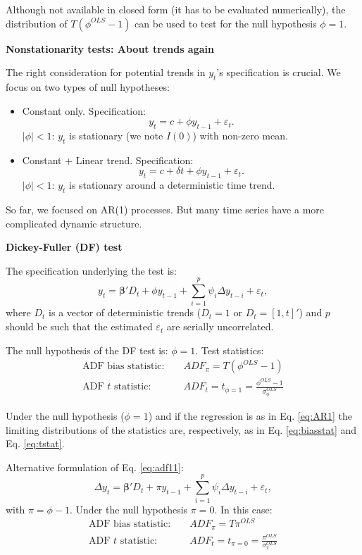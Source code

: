 \documentclass[
  11pt,
]{book}
\providecommand{\tightlist}{%
  \setlength{\itemsep}{0pt}\setlength{\parskip}{0pt}}
\theoremstyle{definition}
\theoremstyle{definition}
\theoremstyle{definition}
\theoremstyle{definition}
\theoremstyle{remark}
\begin{document}
Although not available in closed form (it has to be evaluated numerically), the distribution of \(T(\phi^{OLS}-1)\) can be used to test for the null hypothesis \(\phi=1\).

\textbf{Nonstationarity tests: About trends again}

The right consideration for potential trends in \(y_t\)'s specification is crucial. We focus on two types of null hypotheses:

\begin{itemize}
\tightlist
\item
  Constant only. Specification:
  \[
  y_t = c + \phi y_{t-1} + \varepsilon_t.
  \]
  \(|\phi|<1\): \(y_t\) is stationary (we note \(I(0)\)) with non-zero mean.
\item
  Constant + Linear trend. Specification:
  \[
  y_t = c + \delta t + \phi y_{t-1} + \varepsilon_t.
  \]
  \(|\phi|<1\): \(y_t\) is stationary around a deterministic time trend.
\end{itemize}

So far, we focused on AR(1) processes. But many time series have a more complicated dynamic structure.

\textbf{Dickey-Fuller (DF) test}

The specification underlying the \citet{DF1979} test is:
\begin{equation}
y_t = \boldsymbol\beta'D_t + \phi y_{t-1} + \sum_{i=1}^{p}\psi_i \Delta y_{t-i} + \varepsilon_t,\label{eq:adf11}
\end{equation}
where \(D_t\) is a vector of deterministic trends (\(D_t = 1\) or \(D_t = [1,t]'\)) and \(p\) should be such that the estimated \(\varepsilon_t\) are serially uncorrelated.

The null hypothesis of the DF test is: \(\phi=1\). Test statistics:
\begin{eqnarray*}
\mbox{ADF bias statistic: } && ADF_\pi =T(\phi^{OLS}-1)\\
\mbox{ADF $t$ statistic: } && ADF_t = t_{\phi=1} = \frac{\phi^{OLS}-1}{\sigma^{OLS}_{\phi}}
\end{eqnarray*}

Under the null hypothesis (\(\phi=1\)) and if the regression is as in Eq. \eqref{eq:AR1} the limiting distributions of the statistics are, respectively, as in Eq. \eqref{eq:biasstat} and Eq. \eqref{eq:tstat}.

Alternative formulation of Eq. \eqref{eq:adf11}:
\[
\Delta y_t = \boldsymbol\beta' D_t + \pi y_{t-1} + \sum_{i=1}^{p}\psi_i \Delta y_{t-i} + \varepsilon_t,
\]
with \(\pi = \phi - 1\). Under the null hypothesis \(\pi = 0\). In this case:
\begin{eqnarray*}
\mbox{ADF bias statistic: } && ADF_\pi = T\pi^{OLS}\\
\mbox{ADF $t$ statistic: } && ADF_t = t_{\pi=0} = \frac{\pi^{OLS}}{\sigma^{OLS}_{\pi}}
\end{eqnarray*}
\end{document}
